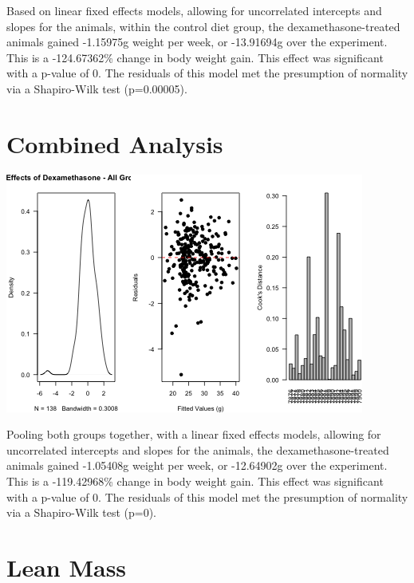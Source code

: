 \documentclass[]{article}
\begin{document}
Based on linear fixed effects models, allowing for uncorrelated
intercepts and slopes for the animals, within the control diet group,
the dexamethasone-treated animals gained -1.15975g weight per week, or
-13.91694g over the experiment. This is a -124.67362\% change in body
weight gain. This effect was significant with a p-value of 0. The
residuals of this model met the presumption of normality via a
Shapiro-Wilk test (p=0.00005).

\section{Combined Analysis}\label{combined-analysis}

\includegraphics{figures/cooks-distance-combined-1.png}

Pooling both groups together, with a linear fixed effects models,
allowing for uncorrelated intercepts and slopes for the animals, the
dexamethasone-treated animals gained -1.05408g weight per week, or
-12.64902g over the experiment. This is a -119.42968\% change in body
weight gain. This effect was significant with a p-value of 0. The
residuals of this model met the presumption of normality via a
Shapiro-Wilk test (p=0).

\section{Lean Mass}\label{lean-mass}
\end{document}

